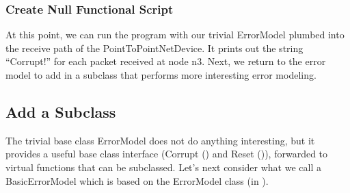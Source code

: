 \documentclass[letterpaper,10pt,english]{sphinxmanual}
\renewcommand{\sphinxcode}[1]{\texttt{\small{#1}}}
\begin{document}
\subsubsection{Create Null Functional Script}
\label{\detokenize{new-models:create-null-functional-script}}
\begin{sphinxVerbatim}[commandchars=\\\{\}]

     
     
      
   


  
   
\end{sphinxVerbatim}

At this point, we can run the program with our trivial ErrorModel plumbed into
the receive path of the PointToPointNetDevice. It prints out the string
“Corrupt!” for each packet received at node n3. Next, we return to the error
model to add in a subclass that performs more interesting error modeling.


\subsection{Add a Subclass}
\label{\detokenize{new-models:add-a-subclass}}
The trivial base class ErrorModel does not do anything interesting, but it
provides a useful base class interface (Corrupt () and Reset ()), forwarded to
virtual functions that can be subclassed. Let’s next consider what we call a
BasicErrorModel which is based on the  ErrorModel class (in
\sphinxcode{\sphinxupquote{ns\sphinxhyphen{}2/queue/errmodel.\{cc,h\}}}).
\end{document}

